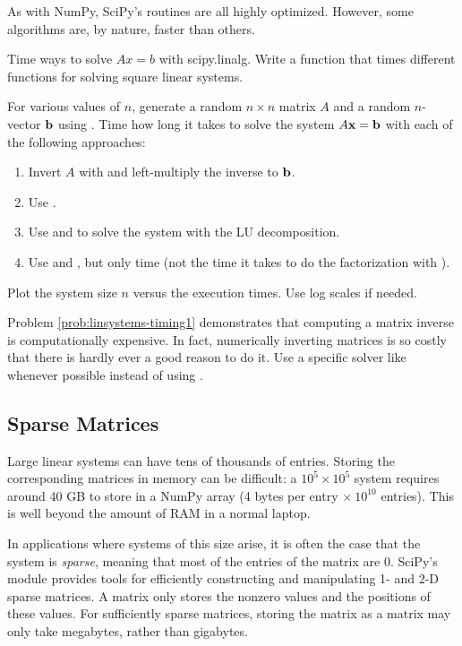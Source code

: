 As with NumPy, SciPy's routines are all highly optimized.
However, some algorithms are, by nature, faster than others.

\begin{problem}{Time ways to solve $Ax = b$ with scipy.linalg.}
Write a function that times different  functions for solving square linear systems.

For various values of $n$, generate a random $n \times n$ matrix $A$ and a random $n$-vector $\mathbf{b}$ using .
Time how long it takes to solve the system $A\mathbf{x} = \mathbf{b}$ with each of the following approaches:
%
\begin{enumerate}
\item Invert $A$ with  and left-multiply the inverse to $\mathbf{b}$.
\item Use .
\item Use  and  to solve the system with the LU decomposition.
\item Use  and , but only time  (not the time it takes to do the factorization with ).
\end{enumerate}
%
Plot the system size $n$ versus the execution times.
Use log scales if needed.
\label{prob:linsystems-timing1}
\end{problem}

\begin{warn}
Problem \ref{prob:linsystems-timing1} demonstrates that computing a matrix inverse is computationally expensive.
In fact, numerically inverting matrices is so costly that there is hardly ever a good reason to do it.
Use a specific solver like  whenever possible instead of using .
\end{warn}

\subsection*{Sparse Matrices} %

Large linear systems can have tens of thousands of entries.
Storing the corresponding matrices in memory can be difficult: a $10^{5} \times 10^{5}$ system requires around 40 GB to store in a NumPy array (4 bytes per entry $\times\ 10^{10}$ entries).
This is well beyond the amount of RAM in a normal laptop.

In applications where systems of this size arise, it is often the case that the system is \emph{sparse}, meaning that most of the entries of the matrix are $0$.
SciPy's  module provides tools for efficiently constructing and manipulating 1- and 2-D sparse matrices.
A  matrix only stores the nonzero values and the positions of these values.
For sufficiently sparse matrices, storing the matrix as a  matrix may only take megabytes, rather than gigabytes.

